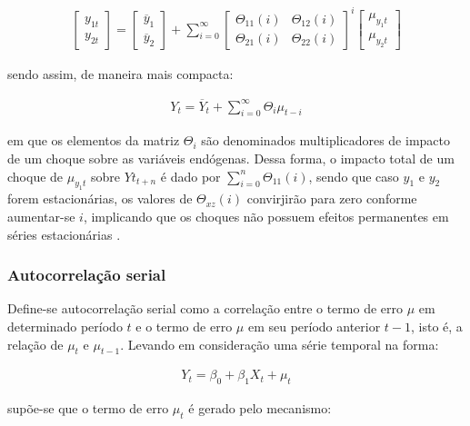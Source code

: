 \begin{ceqn}
\begin{align} \label{eq:irf_2}
\begin{bmatrix}
y_{1t} \\
y_{2t}
\end{bmatrix}
=
\begin{bmatrix}
\overline{y}_{1} \\
\overline{y}_{2}
\end{bmatrix}
+
\sum_{i=0}^{\infty}{\begin{bmatrix} \Theta_{11}(i) & \Theta_{12}(i) \\ \Theta_{21}(i) & \Theta_{22}(i) \end{bmatrix}^i}
\begin{bmatrix}
\mu_{y_{1}t} \\
\mu_{y_{2}t}
\end{bmatrix}
\end{align}
\end{ceqn} sendo assim, de maneira mais compacta:

\begin{ceqn}
\begin{align} \label{eq:irf_3}
Y_{t} = \overline{Y}_{t} + \sum_{i=0}^{\infty}{\Theta_{i} \mu_{t-i}}
\end{align}
\end{ceqn} em que os elementos da matriz $\Theta_{i}$ são denominados multiplicadores de impacto de um choque sobre as variáveis endógenas. Dessa forma, o impacto total de um choque de $\mu_{y_{1}t}$ sobre $Yt_{t+n}$ é dado por $\sum_{i=0}^{n}{\Theta_{11}(i)}$, sendo que caso $y_{1}$ e $y_{2}$ forem estacionárias, os valores de $\Theta_{xz}(i)$ convirjirão para zero conforme aumentar-se $i$, implicando que os choques não possuem efeitos permanentes em séries estacionárias \cite{bueno2008}.

\subsubsection{Autocorrelação serial}

Define-se autocorrelação serial como a correlação entre o termo de erro $\mu$ em determinado período $t$ e o termo de erro $\mu$ em seu período anterior $t-1$, isto é, a relação de $\mu_{t}$ e $\mu_{t-1}$. Levando em consideração uma série temporal na forma:

\begin{ceqn}
\begin{align} \label{eq:ts_autocorrel}
 Y_{t} = \beta_{0} + \beta_{1} X_{t} + \mu_{t}
\end{align}
\end{ceqn} supõe-se que o termo de erro $\mu_{t}$ é gerado pelo mecanismo:

